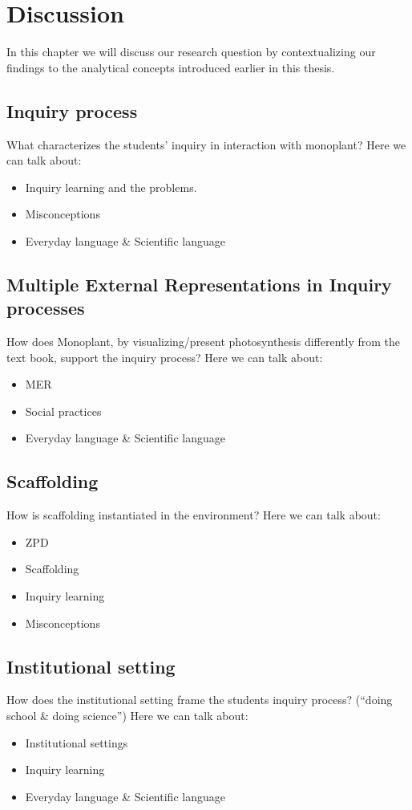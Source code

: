 \chapter{Discussion}
In this chapter we will discuss our research question by contextualizing our findings to the analytical concepts introduced earlier in this thesis. 

\section{Inquiry process}
What characterizes the students’ inquiry in interaction with monoplant?
Here we can talk about: 
\begin{itemize}
\item{Inquiry learning and the problems. \citep{de1998scientific}}
\item{Misconceptions}
\item{Everyday language \& Scientific language}
\end{itemize}

\section{Multiple External Representations in Inquiry processes}
How does Monoplant, by visualizing/present photosynthesis differently from the text book, support the inquiry process? 
Here we can talk about: 
\begin{itemize}
\item{MER}
\item{Social practices}
\item{Everyday language \& Scientific language}
\end{itemize}

\section{Scaffolding}
How is scaffolding instantiated in the environment?
Here we can talk about: 
\begin{itemize}
\item{ZPD}
\item{Scaffolding}
\item{Inquiry learning}
\item{Misconceptions}

\end{itemize}

\section{Institutional setting}
How does the institutional setting frame the students inquiry process? (“doing school \& doing science”)
Here we can talk about: 
\begin{itemize}
\item{Institutional settings}
\item{Inquiry learning}
\item{Everyday language \& Scientific language}
\end{itemize}
